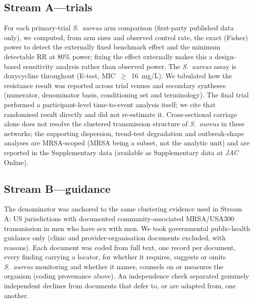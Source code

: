 \documentclass[12pt,a4paper]{article}
\newcommand{\sa}{\emph{S.~aureus}}
\begin{document}
\subsection*{Stream A---trials}
For each primary-trial \sa{} arm comparison (first-party published data only), we
computed, from arm sizes and observed control rate, the exact (Fisher) power to
detect the externally fixed benchmark effect and the minimum detectable RR at
80\% power; fixing the effect externally makes this a design-based sensitivity
analysis rather than observed power. The \sa{} assay is doxycycline throughout
(E-test, MIC~$\geq$~16~mg/L). We tabulated how the resistance result was reported
across trial venues and secondary syntheses (numerator, denominator basis,
conditioning set and terminology). The final trial performed a participant-level time-to-event analysis itself; we cite that randomised result
directly and did not re-estimate it. Cross-sectional carriage alone does not resolve the
clustered transmission structure of \sa{} in these networks; the supporting
dispersion, trend-test degradation and outbreak-shape analyses are MRSA-scoped
(MRSA being a subset, not the analytic unit) and are reported in the
Supplementary data (available as Supplementary data at \textit{JAC} Online).

\subsection*{Stream B---guidance}
The denominator was anchored to the same clustering
evidence used in Stream A: US jurisdictions with documented community-associated
MRSA/USA300 transmission in men who have sex with men.\cite{dejong2025,diep2008}
We took governmental public-health guidance only (clinic and
provider-organisation documents excluded, with reasons). Each document was coded
from full text, one record per document, every finding carrying a locator, for
whether it requires, suggests or omits \sa{} monitoring and whether it names,
counsels on or measures the organism (coding provenance above). An independence
check separated genuinely independent declines from documents that defer to, or
are adapted from, one another.
\end{document}
